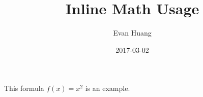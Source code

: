 \documentclass{article}
\title{Inline Math Usage}
\date{2017-03-02}
\author{Evan Huang}
\begin{document}
	\maketitle

	This formula $f(x) = x^2$ is an example.
\end{document}
